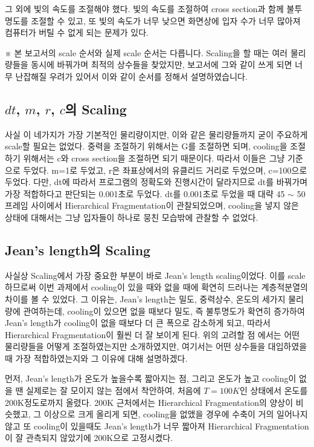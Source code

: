 \documentclass{gshs-hutech}
\begin{document}
그 외에 빛의 속도를 조절해야 했다. 빛의 속도를 조절하여 cross section과 함께 불투명도를 조절할 수 있고, 또 빛의 속도가 너무 낮으면 화면상에 입자 수가 너무 많아져 컴퓨터가 버틸 수 없게 되는 문제가 있다.

※ 본 보고서의 scale 순서와 실제 scale 순서는 다릅니다. Scaling을 할 때는 여러 물리량들을 동시에 바꿔가며 최적의 상수들을 찾았지만, 보고서에 그와 같이 쓰게 되면 너무 난잡해질 우려가 있어서 이와 같이 순서를 정해서 설명하였습니다. 

\subsection{$dt$, $m$, $r$, $c$의 Scaling}

사실 이 네가지가 가장 기본적인 물리량이지만, 이와 같은 물리량들까지 굳이 주요하게 scale할 필요는 없었다. 중력을 조절하기 위해서는 G를 조절하면 되며, cooling을 조절하기 위해서는 c와 cross section을 조절하면 되기 때문이다. 따라서 이들은 그냥 기준으로 두었다. m=1로 두었고, r은 좌표상에서의 유클리드 거리로 두었으며, c=100으로 두었다. 다만, dt에 따라서 프로그램의 정확도와 진행시간이 달라지므로 dt를 바꿔가며 가장 적합하다고 판단되는 0.001초로 두었다. dt를 0.001초로 두었을 때 대략 45 $\sim$ 50프레임 사이에서 Hierarchical Fragmentation이 관찰되었으며, cooling을 넣지 않은 상태에 대해서는 그냥 입자들이 하나로 뭉친 모습밖에 관찰할 수 없었다.


\subsection{Jean's length의 Scaling}

사실상 Scaling에서 가장 중요한 부분이 바로 Jean’s length scaling이었다. 이를 scale하므로써 이번 과제에서 cooling이 있을 때와 없을 때에 확연히 드러나는 계층적분열의 차이를 볼 수 있었다. 그 이유는, Jean’s length는 밀도, 중력상수, 온도의 세가지 물리량에 관여하는데, cooling이 있으면 없을 때보다 밀도, 즉 불투명도가 확연히 증가하여 Jean’s length가 cooling이 없을 때보다 더 큰 폭으로 감소하게 되고, 따라서 Hierarchical Fragmentation이 훨씬 더 잘 보이게 된다. 위의 고려할 점 에서는 어떤 물리량들을 어떻게 조절하였는지만 소개하였지만, 여기서는 어떤 상수들을 대입하였을 때 가장 적합하였는지와 그 이유에 대해 설명하겠다.

먼저, Jean’s length가 온도가 높을수록 짧아지는 점, 그리고 온도가 높고 cooling이 없을 땐 실제로는 잘 모이지 않는 점에서 착안하여, 처음에 $T=100K$인 상태에서 온도를 200K정도로까지 올렸다. 200K 근처에서는 Hierarchical Fragmentation의 양상이 비슷했고, 그 이상으로 크게 올리게 되면, cooling을 없앴을 경우에 수축이 거의 일어나지 않고 또 cooling이 있을때도 Jean’s length가 너무 짧아져 Hierarchical Fragmentation이 잘 관측되지 않았기에 200K으로 고정시켰다. 
\end{document}
